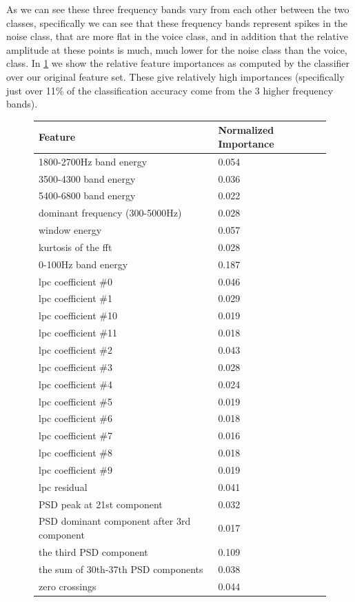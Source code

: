 \documentclass[ %
                    author={Sam Phippen},
                supervisor={Dr. Rafal Bogacz},
                     title={Real time voice activity detectors in noisy personal computing environments},
                  subtitle={},
                    degree={MEng},
                      year={2012} ]{thesis}
\begin{document}
As we can see these three frequency bands vary from each other between the two
classes, specifically we can see that these frequency bands represent spikes in
the noise class, that are more flat in the voice class, and in addition that
the relative amplitude at these points is much, much lower for the noise class
than the voice, class. In \ref{table:importances} we show the relative feature
importances as computed by the classifier over our original feature set. These
give relatively high importances (specifically just over 11\% of
the classification accuracy come from the 3 higher frequency bands).

\begin{figure}
    \label{table:importances}
    \begin{tabular}{| l | l |}
    \hline
        Feature & Normalized Importance \\ \hline
        1800-2700Hz band energy & 0.054 \\
        3500-4300 band energy & 0.036 \\
        5400-6800 band energy & 0.022 \\
        dominant frequency (300-5000Hz) & 0.028 \\
        window energy & 0.057 \\
        kurtosis of the fft & 0.028 \\
        0-100Hz band energy & 0.187 \\
        lpc coefficient \#0 & 0.046 \\
        lpc coefficient \#1 & 0.029 \\
        lpc coefficient \#10 & 0.019 \\
        lpc coefficient \#11 & 0.018 \\
        lpc coefficient \#2 & 0.043 \\
        lpc coefficient \#3 & 0.028 \\
        lpc coefficient \#4 & 0.024 \\
        lpc coefficient \#5 & 0.019 \\
        lpc coefficient \#6 & 0.018 \\
        lpc coefficient \#7 & 0.016 \\
        lpc coefficient \#8 & 0.018 \\
        lpc coefficient \#9 & 0.019 \\
        lpc residual & 0.041 \\
        PSD peak at 21st component & 0.032 \\
        PSD dominant component after 3rd component & 0.017 \\
        the third PSD component & 0.109 \\
        the sum of 30th-37th PSD components & 0.038 \\
        zero crossings & 0.044  \\
    \hline
    \end{tabular}
\end{figure}
\end{document}
